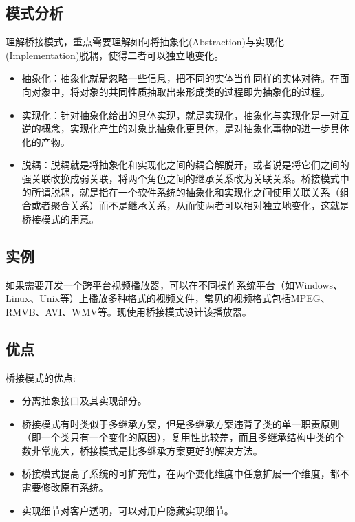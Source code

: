 \documentclass[letterpaper,10pt,english]{sphinxmanual}
\begin{document}
\subsection{模式分析}
\label{\detokenize{structural_patterns/bridge:id8}}
\sphinxAtStartPar
理解桥接模式，重点需要理解如何将抽象化(Abstraction)与实现化(Implementation)脱耦，使得二者可以独立地变化。
\begin{itemize}
\item {} 
\sphinxAtStartPar
抽象化：抽象化就是忽略一些信息，把不同的实体当作同样的实体对待。在面向对象中，将对象的共同性质抽取出来形成类的过程即为抽象化的过程。

\item {} 
\sphinxAtStartPar
实现化：针对抽象化给出的具体实现，就是实现化，抽象化与实现化是一对互逆的概念，实现化产生的对象比抽象化更具体，是对抽象化事物的进一步具体化的产物。

\item {} 
\sphinxAtStartPar
脱耦：脱耦就是将抽象化和实现化之间的耦合解脱开，或者说是将它们之间的强关联改换成弱关联，将两个角色之间的继承关系改为关联关系。桥接模式中的所谓脱耦，就是指在一个软件系统的抽象化和实现化之间使用关联关系（组合或者聚合关系）而不是继承关系，从而使两者可以相对独立地变化，这就是桥接模式的用意。

\end{itemize}


\subsection{实例}
\label{\detokenize{structural_patterns/bridge:id9}}
\sphinxAtStartPar
如果需要开发一个跨平台视频播放器，可以在不同操作系统平台（如Windows、Linux、Unix等）上播放多种格式的视频文件，常见的视频格式包括MPEG、RMVB、AVI、WMV等。现使用桥接模式设计该播放器。


\subsection{优点}
\label{\detokenize{structural_patterns/bridge:id10}}
\sphinxAtStartPar
桥接模式的优点:
\begin{itemize}
\item {} 
\sphinxAtStartPar
分离抽象接口及其实现部分。

\item {} 
\sphinxAtStartPar
桥接模式有时类似于多继承方案，但是多继承方案违背了类的单一职责原则（即一个类只有一个变化的原因），复用性比较差，而且多继承结构中类的个数非常庞大，桥接模式是比多继承方案更好的解决方法。

\item {} 
\sphinxAtStartPar
桥接模式提高了系统的可扩充性，在两个变化维度中任意扩展一个维度，都不需要修改原有系统。

\item {} 
\sphinxAtStartPar
实现细节对客户透明，可以对用户隐藏实现细节。

\end{itemize}
\end{document}

